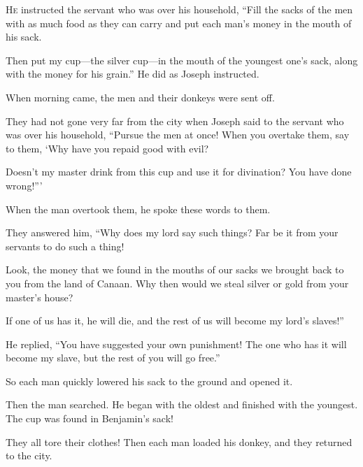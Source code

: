 \begin{scripture}
 \allowchapbreak\hypertarget{ch-genesis-44}{}\lettrine[lines=5]{\color{pentateuch}H}{\textsc{e}} instructed the servant who was over his household, ``Fill the sacks of the men with as much food as they can carry and put each man's money in the mouth of his sack.\everypar{}
 Then put my cup---the silver cup---in the mouth of the youngest one's sack, along with the money for his grain.'' He did as Joseph instructed.
\\\indent{} When morning came, the men and their donkeys were sent off.
 They had not gone very far from the city when Joseph said to the servant who was over his household, ``Pursue the men at once! When you overtake them, say to them, `Why have you repaid good with evil?
 Doesn't my master drink from this cup and use it for divination? You have done wrong!'''
\everypar{}

 When the man overtook them, he spoke these words to them.
 They answered him, ``Why does my lord say such things? Far be it from your servants to do such a thing!
 Look, the money that we found in the mouths of our sacks we brought back to you from the land of Canaan. Why then would we steal silver or gold from your master's house?
 If one of us has it, he will die, and the rest of us will become my lord's slaves!''
\everypar{}

 He replied, ``You have suggested your own punishment! The one who has it will become my slave, but the rest of you will go free.''
 So each man quickly lowered his sack to the ground and opened it.
 Then the man searched. He began with the oldest and finished with the youngest. The cup was found in Benjamin's sack!
 They all tore their clothes! Then each man loaded his donkey, and they returned to the city.
\everypar{}


\end{scripture}
